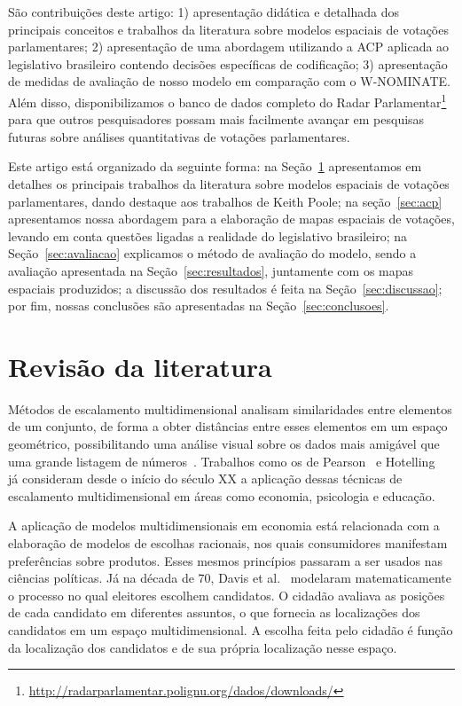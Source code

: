 \documentclass[
	article,			%
	12pt,				%
	oneside,			%
	a4paper,			%
	english,			%
	brazil,				%
	sumario=tradicional,
	oldfontcommands %
	]{abntex2}
\newcommand\wnominate{W-NOMINATE\xspace}
\begin{document}
São contribuições deste artigo: 1) apresentação didática e detalhada dos principais conceitos e trabalhos da literatura sobre modelos espaciais de votações parlamentares; 2) apresentação de uma abordagem utilizando a ACP aplicada ao legislativo brasileiro contendo decisões específicas de codificação; 3) apresentação de medidas de avaliação de nosso modelo em comparação com o \wnominate.
Além disso, disponibilizamos o banco de dados completo do Radar Parlamentar\footnote{\url{http://radarparlamentar.polignu.org/dados/downloads/}} para que outros pesquisadores possam mais facilmente avançar em pesquisas futuras sobre análises quantitativas de votações parlamentares.

Este artigo está organizado da seguinte forma: na Seção~\ref{sec:revbib} apresentamos em detalhes os principais trabalhos da literatura sobre modelos espaciais de votações parlamentares, dando destaque aos trabalhos de Keith Poole; na seção~\ref{sec:acp} apresentamos nossa abordagem para a elaboração de mapas espaciais de votações, levando em conta questões ligadas a realidade do legislativo brasileiro; na Seção~\ref{sec:avaliacao} explicamos o método de avaliação do modelo, sendo a avaliação apresentada na Seção~\ref{sec:resultados}, juntamente com os mapas espaciais produzidos; a discussão dos resultados é feita na Seção~\ref{sec:discussao}; por fim, nossas conclusões são apresentadas na Seção~\ref{sec:conclusoes}.



\section{Revisão da literatura}
\label{sec:revbib}

Métodos de escalamento multidimensional analisam similaridades entre elementos de um conjunto, de forma a obter distâncias entre esses elementos em um espaço geométrico, possibilitando uma análise visual sobre os dados mais amigável que uma grande listagem de números~\cite{borg2005mds}. Trabalhos como os de Pearson~\cite{pearson1901} e Hotelling~\cite{hotelling1933} já consideram desde o início do século XX a aplicação dessas técnicas de escalamento multidimensional em áreas como economia, psicologia e educação.

A aplicação de modelos multidimensionais em economia está relacionada com a elaboração de modelos de escolhas racionais, nos quais consumidores manifestam preferências sobre produtos. Esses mesmos princípios passaram a ser usados nas ciências políticas. Já na década de 70, Davis et al.~\cite{davis1970electoral} modelaram matematicamente o processo no qual eleitores escolhem candidatos. O cidadão avaliava as posições de cada candidato em diferentes assuntos, o que fornecia as localizações dos candidatos em um espaço multidimensional. A escolha feita pelo cidadão é função da localização dos candidatos e de sua própria localização nesse espaço. 
\end{document}
